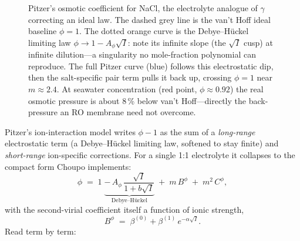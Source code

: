 \documentclass[11pt,a4paper]{article}
\begin{document}
\begin{figure}[ht]
\centering
{}
\caption{Pitzer's osmotic coefficient for NaCl, the electrolyte analogue
of $\gamma$ correcting an ideal law.  The dashed grey line is the van't
Hoff ideal baseline $\phi=1$.  The dotted orange curve is the
Debye--H\"uckel limiting law $\phi\to 1-A_\phi\sqrt I$: note its infinite
slope (the $\sqrt I$ cusp) at infinite dilution---a singularity no
mole-fraction polynomial can reproduce.  The full Pitzer curve (blue)
follows this electrostatic dip, then the salt-specific pair term pulls it
back up, crossing $\phi=1$ near $m\approx 2.4$.  At seawater
concentration (red point, $\phi\approx0.92$) the real osmotic pressure is
about 8\,\% below van't Hoff---directly the back-pressure an RO membrane
need not overcome.}
\label{fig:pitzer-phi}
\end{figure}


Pitzer's ion-interaction model writes $\phi - 1$ as the sum of a
\emph{long-range} electrostatic term (a Debye--H\"uckel limiting law,
softened to stay finite) and \emph{short-range} ion-specific
corrections.  For a single 1:1 electrolyte it collapses to the compact
form Choupo implements:
\begin{equation}
   \boxed{\;
   \phi \;=\; 1
   \;\underbrace{-\,A_\phi\,\frac{\sqrt I}{1 + b\sqrt I}}_{\text{Debye--H\"uckel}}
   \;+\; m\,B^{\phi}
   \;+\; m^{2}\,C^{\phi},
   \;}
   \label{eq:pitzer-phi}
\end{equation}
with the second-virial coefficient itself a function of ionic
strength,
\begin{equation}
   B^{\phi} \;=\; \beta^{(0)} + \beta^{(1)}\,e^{-\alpha\sqrt I}.
   \label{eq:pitzer-B}
\end{equation}
Read term by term:
\end{document}

